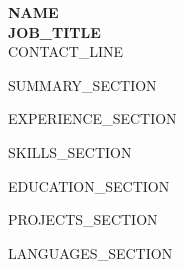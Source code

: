 ﻿\documentclass[10pt,a4paper]{article}
\begin{document}
\begin{center}
  {\huge\textbf{\color{primary} {{NAME}}}}\\[0.2em]
  {\footnotesize\textbf{\color{accent} {{JOB_TITLE}}}}\\[0.3em]
  {\footnotesize\color{darkgray} {{CONTACT_LINE}}}
\end{center}

\vspace{0.3em}

{{SUMMARY_SECTION}}

{{EXPERIENCE_SECTION}}

{{SKILLS_SECTION}}

{{EDUCATION_SECTION}}

{{PROJECTS_SECTION}}

{{LANGUAGES_SECTION}}
\end{document}
